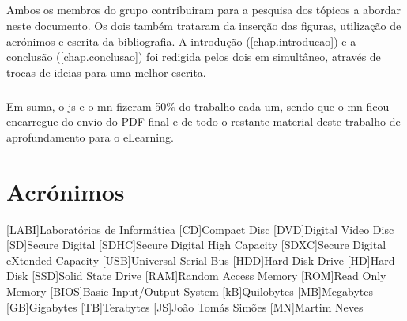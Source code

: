 \documentclass[a4paper]{report}
\begin{document}
\paragraph*{}Ambos os membros do grupo contribuiram para a pesquisa dos tópicos a abordar neste documento.
Os dois também trataram da inserção das figuras, utilização de acrónimos e escrita da bibliografia. 
A introdução (\autoref{chap.introducao}) e a conclusão (\autoref{chap.conclusao}) foi redigida pelos dois em simultâneo, através de trocas de ideias para uma melhor escrita. 

\paragraph*{}Em suma, o \ac{js} e o \ac{mn} fizeram 50\% do trabalho cada um, sendo que o \ac{mn} ficou encarregue do envio do PDF final e de todo o restante material deste trabalho de aprofundamento para o eLearning.

\chapter*{Acrónimos}
\begin{acronym}
[LABI]{Laboratórios de Informática}
[CD]{Compact Disc}
[DVD]{Digital Video Disc}
[SD]{Secure Digital}
[SDHC]{Secure Digital High Capacity}
[SDXC]{Secure Digital eXtended Capacity}
[USB]{Universal Serial Bus}
[HDD]{Hard Disk Drive}
[HD]{Hard Disk}
[SSD]{Solid State Drive}
[RAM]{Random Access Memory}
[ROM]{Read Only Memory}
[BIOS]{Basic Input/Output System}
[kB]{Quilobytes}
[MB]{Megabytes}
[GB]{Gigabytes}
[TB]{Terabytes}
[JS]{João Tomás Simões}
[MN]{Martim Neves}
\end{acronym}
\end{document}
